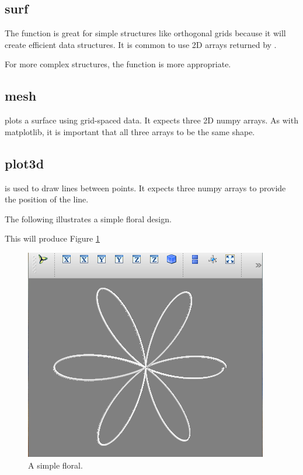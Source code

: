 \subsection*{surf}

The  function is great for simple structures like orthogonal grids 
because it will create efficient data structures. 
It is common to use 2D arrays returned by . 

For more complex structures, the  function is more appropriate. 

\subsection*{mesh}
 plots a surface using grid-spaced data. 
It expects three 2D numpy arrays. As with matplotlib, it is important that 
all three arrays to be the same shape. 

\subsection*{plot3d}
 is used to draw lines between points. It expects three numpy 
arrays to provide the position of the line. 

The following illustrates a simple floral design.



This will produce Figure \ref{mayavi:plot3d.pdf}

\begin{figure} 
\includegraphics[width=\textwidth]{plot3d.pdf}
\caption{A simple floral. } 
\label{mayavi:plot3d.pdf}
\end{figure}



